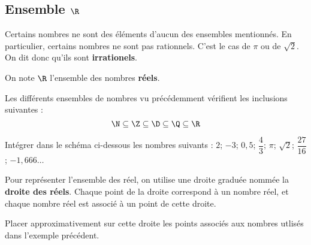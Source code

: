\documentclass{article}
\begin{document}
\subsection{Ensemble $\R$}
\begin{remark}
Certains nombres ne sont des éléments d'aucun des ensembles mentionnés. En particulier, certains nombres ne sont pas rationnels. C'est le cas de $\pi$ ou de $\sqrt{2}$. On dit donc qu'ils sont \textbf{irrationels}.
\end{remark}
\begin{tcolorbox}
\begin{definition}
On note $\R$ l'ensemble des nombres \textbf{réels}.
\end{definition}
\end{tcolorbox}
\begin{tcolorbox}
\begin{proposition}
Les différents ensembles de nombres vu précédemment vérifient les inclusions suivantes :
\begin{equation*}
\N \subseteq \Z \subseteq \D \subseteq \Q \subseteq \R
\end{equation*}
\end{proposition}
\end{tcolorbox}
\begin{example}
Intégrer dans le schéma ci-dessous les nombres suivants : $2$; $-3$; $0,5$; $\dfrac{4}{3}$; $\pi$; $\sqrt{2}$; $\dfrac{27}{16}$; $-1,666\dots{}$


\begin{center}
\end{center}
\end{example}
\begin{proposition}
Pour représenter l'ensemble des réel, on utilise une droite graduée nommée la \textbf{droite des réels}. Chaque point de la droite correspond à un nombre réel, et chaque nombre réel est associé à un point de cette droite.
\end{proposition}
\begin{center}
\end{center}
\begin{example}
Placer approximativement sur cette droite les points associés aux nombres utlisés dans l'exemple précédent.
\end{example}
\end{document}
